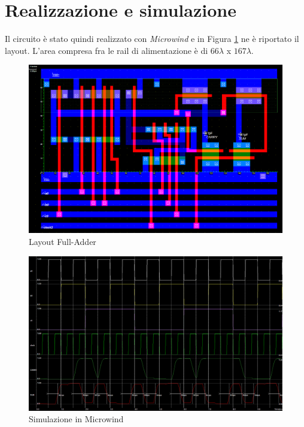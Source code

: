 \documentclass[11pt]{article} %
\begin{document}
\section{Realizzazione e simulazione}

Il circuito è stato quindi realizzato con \emph{Microwind} e in Figura \ref{fig:Layout1} ne è riportato il layout.
L'area compresa fra le rail di alimentazione è di $66\lambda$ x $167 \lambda$.

\begin{figure}[h!]
  \includegraphics[width=\linewidth]{Layout1.png}
  \caption{Layout Full-Adder}
  \label{fig:Layout1}
\end{figure}

\begin{figure}[h!]
  \includegraphics[width=\linewidth]{Micro1.png}
  \caption{Simulazione in Microwind}
  \label{fig:Micro1}
\end{figure}
\end{document}

